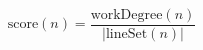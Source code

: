 \documentclass{article}
\begin{document}
\[  \text{score}(n) = \frac{\text{workDegree}(n)}{|\text{lineSet}(n)|}
\]
\pagebreak
\end{document}
